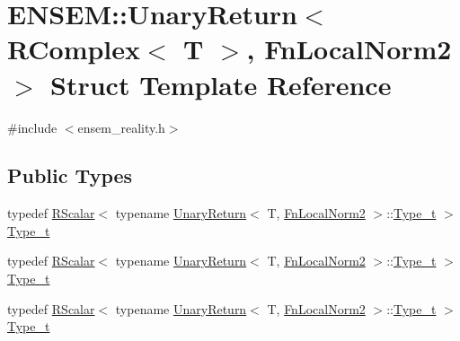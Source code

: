 \hypertarget{structENSEM_1_1UnaryReturn_3_01RComplex_3_01T_01_4_00_01FnLocalNorm2_01_4}{}\section{E\+N\+S\+EM\+:\+:Unary\+Return$<$ R\+Complex$<$ T $>$, Fn\+Local\+Norm2 $>$ Struct Template Reference}
\label{structENSEM_1_1UnaryReturn_3_01RComplex_3_01T_01_4_00_01FnLocalNorm2_01_4}


{\ttfamily \#include $<$ensem\+\_\+reality.\+h$>$}

\subsection*{Public Types}
\begin{DoxyCompactItemize}
\item 
typedef \mbox{\hyperlink{classENSEM_1_1RScalar}{R\+Scalar}}$<$ typename \mbox{\hyperlink{structENSEM_1_1UnaryReturn}{Unary\+Return}}$<$ T, \mbox{\hyperlink{structENSEM_1_1FnLocalNorm2}{Fn\+Local\+Norm2}} $>$\+::\mbox{\hyperlink{structENSEM_1_1UnaryReturn_3_01RComplex_3_01T_01_4_00_01FnLocalNorm2_01_4_acf4480dbc7c87e67898043db4bd45a41}{Type\+\_\+t}} $>$ \mbox{\hyperlink{structENSEM_1_1UnaryReturn_3_01RComplex_3_01T_01_4_00_01FnLocalNorm2_01_4_acf4480dbc7c87e67898043db4bd45a41}{Type\+\_\+t}}
\item 
typedef \mbox{\hyperlink{classENSEM_1_1RScalar}{R\+Scalar}}$<$ typename \mbox{\hyperlink{structENSEM_1_1UnaryReturn}{Unary\+Return}}$<$ T, \mbox{\hyperlink{structENSEM_1_1FnLocalNorm2}{Fn\+Local\+Norm2}} $>$\+::\mbox{\hyperlink{structENSEM_1_1UnaryReturn_3_01RComplex_3_01T_01_4_00_01FnLocalNorm2_01_4_acf4480dbc7c87e67898043db4bd45a41}{Type\+\_\+t}} $>$ \mbox{\hyperlink{structENSEM_1_1UnaryReturn_3_01RComplex_3_01T_01_4_00_01FnLocalNorm2_01_4_acf4480dbc7c87e67898043db4bd45a41}{Type\+\_\+t}}
\item 
typedef \mbox{\hyperlink{classENSEM_1_1RScalar}{R\+Scalar}}$<$ typename \mbox{\hyperlink{structENSEM_1_1UnaryReturn}{Unary\+Return}}$<$ T, \mbox{\hyperlink{structENSEM_1_1FnLocalNorm2}{Fn\+Local\+Norm2}} $>$\+::\mbox{\hyperlink{structENSEM_1_1UnaryReturn_3_01RComplex_3_01T_01_4_00_01FnLocalNorm2_01_4_acf4480dbc7c87e67898043db4bd45a41}{Type\+\_\+t}} $>$ \mbox{\hyperlink{structENSEM_1_1UnaryReturn_3_01RComplex_3_01T_01_4_00_01FnLocalNorm2_01_4_acf4480dbc7c87e67898043db4bd45a41}{Type\+\_\+t}}
\end{DoxyCompactItemize}


